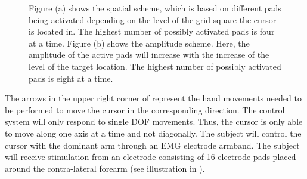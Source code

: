 \begin{figure} [H]
	\caption{Figure (a) shows the spatial scheme, which is based on different pads being activated depending on the level of the grid square the cursor is located in. The highest number of possibly activated pads is four at a time. Figure (b) shows the amplitude scheme. Here, the amplitude of the active pads will increase with the increase of the level of the target location. The highest number of possibly activated pads is eight at a time.}
	\label{fig:sensconfigs}
\end{figure}


The arrows in the upper right corner of  represent the hand movements needed to be performed to move the cursor in the corresponding direction. The control system will only respond to single DOF movements. Thus, the cursor is only able to move along one axis at a time and not diagonally. The subject will control the cursor with the dominant arm through an EMG electrode armband. The subject will receive stimulation from an electrode consisting of 16 electrode pads placed around the contra-lateral forearm (see illustration in ).



